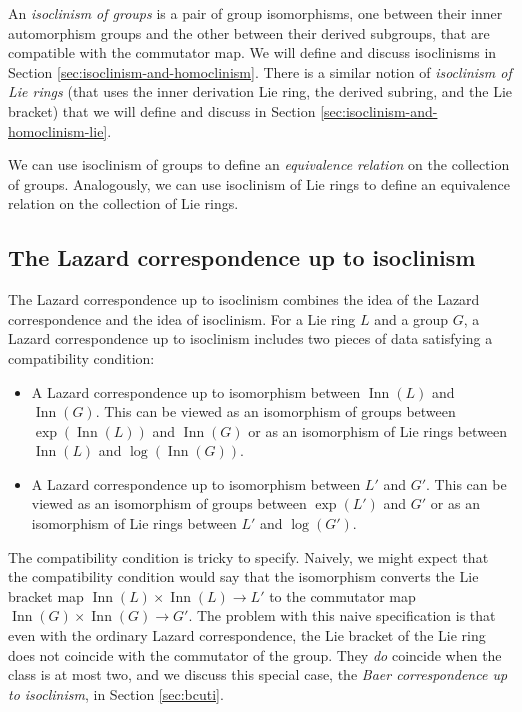 \documentclass{ucetd}
\begin{document}
An {\em isoclinism of groups} is a pair of group isomorphisms, one
between their inner automorphism groups and the other between their
derived subgroups, that are compatible with the commutator map. We
will define and discuss isoclinisms in Section
\ref{sec:isoclinism-and-homoclinism}. There is a similar notion of
    {\em isoclinism of Lie rings} (that uses the inner derivation Lie
    ring, the derived subring, and the Lie bracket) that we will
    define and discuss in Section
    \ref{sec:isoclinism-and-homoclinism-lie}.

We can use isoclinism of groups to define an {\em equivalence
  relation} on the collection of groups. Analogously, we can use
isoclinism of Lie rings to define an equivalence relation on the
collection of Lie rings.

\subsection{The Lazard correspondence up to isoclinism}

The Lazard correspondence up to isoclinism combines the idea of the
Lazard correspondence and the idea of isoclinism. For a Lie ring $L$
and a group $G$, a Lazard correspondence up to isoclinism includes two
pieces of data satisfying a compatibility condition:

\begin{itemize}
\item A Lazard correspondence up to isomorphism between
  $\operatorname{Inn}(L)$ and $\operatorname{Inn}(G)$. This can be
  viewed as an isomorphism of groups between
  $\exp(\operatorname{Inn}(L))$ and $\operatorname{Inn}(G)$ or as an
  isomorphism of Lie rings between $\operatorname{Inn}(L)$ and
  $\log(\operatorname{Inn}(G))$.
\item A Lazard correspondence up to isomorphism between $L'$ and
  $G'$. This can be viewed as an isomorphism of groups between
  $\exp(L')$ and $G'$ or as an isomorphism of Lie rings between $L'$
  and $\log(G')$.
\end{itemize}

The compatibility condition is tricky to specify. Naively, we might
expect that the compatibility condition would say that the isomorphism
converts the Lie bracket map $\operatorname{Inn}(L) \times
\operatorname{Inn}(L) \to L'$ to the commutator map
$\operatorname{Inn}(G) \times \operatorname{Inn}(G) \to G'$. The
problem with this naive specification is that even with the ordinary
Lazard correspondence, the Lie bracket of the Lie ring does not
coincide with the commutator of the group. They {\em do} coincide when
the class is at most two, and we discuss this special case, the {\em
  Baer correspondence up to isoclinism}, in Section \ref{sec:bcuti}.
\end{document}
